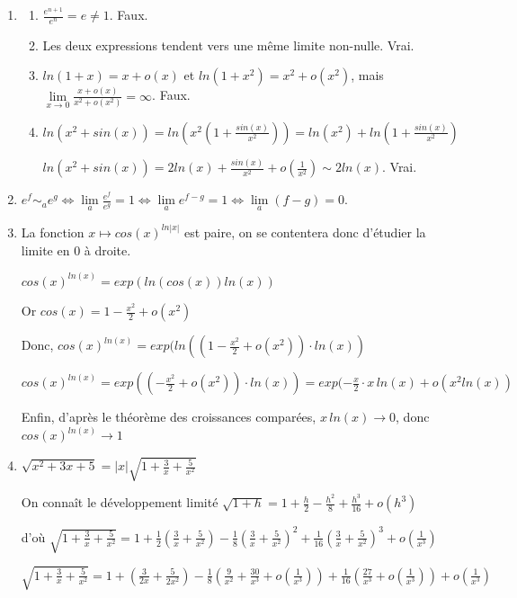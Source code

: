 \documentclass[]{article}
\begin{document}
\begin{enumerate}
\item
\begin{enumerate}
	\item $\frac{e^{n+1}}{e^n}=e \ne 1$. Faux.
	\item Les deux expressions tendent vers une même limite non-nulle. Vrai.
	\item $ln(1+x) = x + o(x)$ et $ln(1+x^2)=x^2+o(x^2)$, mais $\displaystyle \lim\limits_{x \to 0} \frac{x+o(x)}{x^2+o(x^2)}= \infty$. Faux.
	\item $ln(x^2+sin(x))=ln\left(x^2\left(1+\frac{sin(x)}{x^2}\right)\right)=ln(x^2)+ln\left(1+\frac{sin(x)}{x^2}\right)$
	
	$ln(x^2+sin(x))=2ln(x)+\frac{sin(x)}{x^2}+o\left(\frac{1}{x^2}\right) \sim 2ln(x)$. Vrai.
\end{enumerate}

\item $e^f \sim_a e^g \Leftrightarrow \lim\limits_{a} \frac{e^f}{e^g} = 1 \Leftrightarrow \lim\limits_{a} e^{f-g} = 1 \Leftrightarrow \lim\limits_{a}(f-g)=0$.

\item La fonction $x \longmapsto cos(x)^{ln |x|}$ est paire, on se contentera donc d'étudier la limite en $0$ à droite.

$cos(x)^{ln (x)}=exp(ln(cos(x)) ln(x))$

Or $cos(x) = 1 - \frac{x^2}{2}+ o(x^2)$

Donc, $cos(x)^{ln(x)} = exp(ln((1 - \frac{x^2}{2} + o(x^2)) \cdot ln(x))$

$cos(x)^{ln(x)} = exp((-\frac{x^2}{2}+o(x^2)) \cdot ln(x))=exp(-\frac{x}{2} \cdot x \, ln(x) + o(x^2ln(x))$

Enfin, d'après le théorème des croissances comparées, $x \, ln(x) \to 0$, donc $cos(x)^{ln(x)} \to 1$

\item $\sqrt{x^2+3x+5}=|x|\sqrt{1+\frac{3}{x}+\frac{5}{x^2}}$

On connaît le développement limité $\sqrt{1+h}=1+\frac{h}{2}-\frac{h^2}{8}+\frac{h^3}{16} + o(h^3)$

d'où $\sqrt{1+\frac{3}{x}+\frac{5}{x^2}} = 1+\frac{1}{2}(\frac{3}{x}+\frac{5}{x^2})-\frac{1}{8}(\frac{3}{x}+\frac{5}{x^2})^2+\frac{1}{16}(\frac{3}{x}+\frac{5}{x^2})^3 + o(\frac{1}{x^3})$

$\sqrt{1+\frac{3}{x}+\frac{5}{x^2}} = 1+(\frac{3}{2x}+\frac{5}{2x^2})-\frac{1}{8}(\frac{9}{x^2}+\frac{30}{x^3}+o(\frac{1}{x^3}))+\frac{1}{16}(\frac{27}{x^3}+o(\frac{1}{x^3})) + o(\frac{1}{x^3})$


\end{enumerate}
\end{document}
